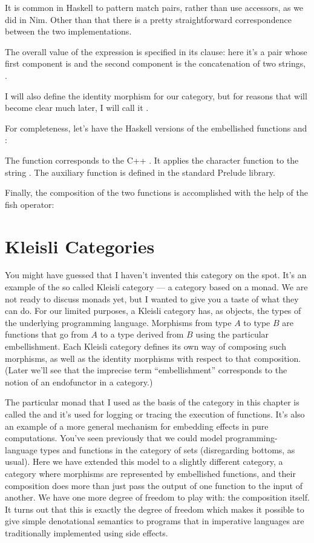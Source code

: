 It is common in Haskell to pattern match pairs, rather than use
accessors, as we did in Nim. Other than that there is a pretty
straightforward correspondence between the two implementations.

The overall value of the  expression is specified in its
 clause: here it's a pair whose first component is 
and the second component is the concatenation of two strings,
.

I will also define the identity morphism for our category, but for
reasons that will become clear much later, I will call it
.

For completeness, let's have the Haskell versions of the embellished
functions  and :

The function  corresponds to the C++ . It
applies the character function  to the string
. The auxiliary function  is defined in the
standard Prelude library.

Finally, the composition of the two functions is accomplished with the
help of the fish operator:


\section{Kleisli Categories}

You might have guessed that I haven't invented this category on the
spot. It's an example of the so called Kleisli category --- a category
based on a monad. We are not ready to discuss monads yet, but I wanted
to give you a taste of what they can do. For our limited purposes, a
Kleisli category has, as objects, the types of the underlying
programming language. Morphisms from type $A$ to type $B$ are functions that
go from $A$ to a type derived from $B$ using the particular embellishment.
Each Kleisli category defines its own way of composing such morphisms,
as well as the identity morphisms with respect to that composition.
(Later we'll see that the imprecise term ``embellishment'' corresponds
to the notion of an endofunctor in a category.)

The particular monad that I used as the basis of the category in this
chapter is called the  and it's used for logging or
tracing the execution of functions. It's also an example of a more
general mechanism for embedding effects in pure computations. You've
seen previously that we could model programming-language types and
functions in the category of sets (disregarding bottoms, as usual). Here
we have extended this model to a slightly different category, a category
where morphisms are represented by embellished functions, and their
composition does more than just pass the output of one function to the
input of another. We have one more degree of freedom to play with: the
composition itself. It turns out that this is exactly the degree of
freedom which makes it possible to give simple denotational semantics to
programs that in imperative languages are traditionally implemented
using side effects.

